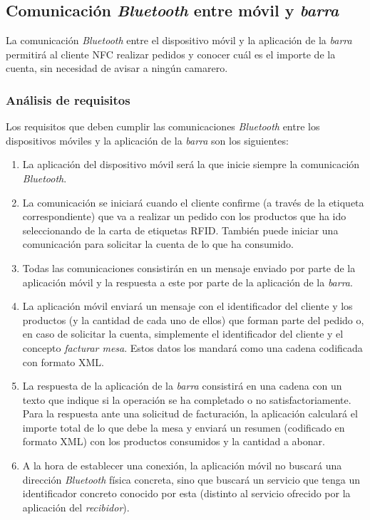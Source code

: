 \subsection{Comunicación \emph{Bluetooth} entre móvil y \emph{barra}}
\label{subsec:mobile-bar}
La comunicación \emph{Bluetooth} entre el dispositivo móvil y la aplicación
de la \emph{barra} permitirá al cliente \acs{NFC} realizar pedidos y conocer
cuál es el importe de la cuenta, sin necesidad de avisar a ningún camarero.

\subsubsection{Análisis de requisitos}
Los requisitos que deben cumplir las comunicaciones \emph{Bluetooth} entre
los dispositivos móviles y la aplicación de la \emph{barra} son los
siguientes:
\begin{enumerate}
\item La aplicación del dispositivo móvil será la que inicie siempre la
comunicación \emph{Bluetooth}.
\item La comunicación se iniciará cuando el cliente confirme (a través de la
etiqueta correspondiente) que va a realizar un pedido con los productos que ha 
ido seleccionando de la carta de etiquetas \acs{RFID}. También puede iniciar
una comunicación para solicitar la cuenta de lo que ha consumido.
\item Todas las comunicaciones consistirán en un mensaje enviado por parte de
la aplicación móvil y la respuesta a este por parte de la aplicación de la
\emph{barra}.
\item La aplicación móvil enviará un mensaje con el identificador del cliente
y los productos (y la cantidad de cada uno de ellos) que forman parte del
pedido o, en caso de solicitar la cuenta, simplemente el identificador del
cliente y el concepto \emph{facturar mesa}. Estos datos los mandará como una
cadena codificada con formato \acs{XML}.
\item La respuesta de la aplicación de la \emph{barra} consistirá en una cadena 
con un texto que indique si la operación se ha completado o no 
satisfactoriamente.
Para la respuesta ante una solicitud de facturación, la aplicación calculará
el importe total de lo que debe la mesa y enviará un resumen (codificado
en formato \acs{XML}) con los productos consumidos y la cantidad a abonar.
\item A la hora de establecer una conexión, la aplicación móvil no buscará una
dirección \emph{Bluetooth} física concreta, sino que buscará un servicio que
tenga un identificador concreto conocido por esta (distinto al servicio
ofrecido por la aplicación del \emph{recibidor}).
\end{enumerate}

